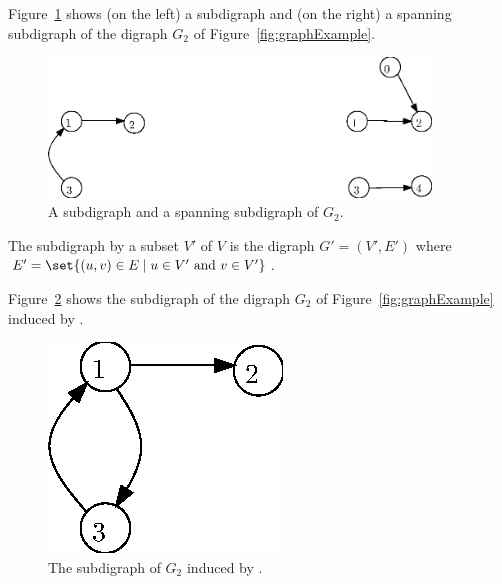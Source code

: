 \begin{Example}
Figure~\ref{fig:sub+span} shows (on the left) a subdigraph and (on the right) 
a spanning subdigraph of the digraph $G_2$ of Figure~\ref{fig:graphExample}.
\end{Example}

\begin{figure}[h]
\begin{center}
\includegraphics[width=4in]{figs/wSub+Span.eps}
\end{center}
\caption{A subdigraph and a spanning subdigraph of $G_2$.}
\label{fig:sub+span}
\end{figure}

\begin{Definition}
The subdigraph  by a subset $V'$ of $V$ is the digraph
$G' = (V', E')$ where $E' = \set{(u, v) \in E \mid u \in V' \mbox{ and } v\in V'}$.
\end{Definition}

\begin{Example}
Figure~\ref{fig:induced} shows the subdigraph of the  digraph $G_2$ of Figure~\ref{fig:graphExample} induced by 
.
\end{Example}

\begin{figure}[h]
\begin{center}
\includegraphics{figs/wInduced.eps}
\end{center}
\caption{The subdigraph of $G_2$ induced by .}
\label{fig:induced}
\end{figure}


